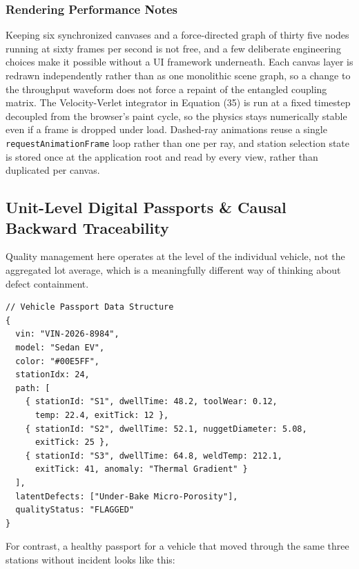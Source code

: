 \documentclass[11pt]{article}
\begin{document}
\subsubsection{Rendering Performance Notes}

Keeping six synchronized canvases and a force-directed graph of thirty five nodes running at sixty frames per second is not free, and a few deliberate engineering choices make it possible without a UI framework underneath. Each canvas layer is redrawn independently rather than as one monolithic scene graph, so a change to the throughput waveform does not force a repaint of the entangled coupling matrix. The Velocity-Verlet integrator in Equation (35) is run at a fixed timestep decoupled from the browser's paint cycle, so the physics stays numerically stable even if a frame is dropped under load. Dashed-ray animations reuse a single \texttt{requestAnimationFrame} loop rather than one per ray, and station selection state is stored once at the application root and read by every view, rather than duplicated per canvas.

\subsection{Unit-Level Digital Passports \& Causal Backward Traceability}

Quality management here operates at the level of the individual vehicle, not the aggregated lot average, which is a meaningfully different way of thinking about defect containment.

\begin{tcolorbox}[colback=lightbg,colframe=sylasgray,arc=1mm,fontupper=\ttfamily\small,breakable]
\begin{verbatim}
// Vehicle Passport Data Structure
{
  vin: "VIN-2026-8984",
  model: "Sedan EV",
  color: "#00E5FF",
  stationIdx: 24,
  path: [
    { stationId: "S1", dwellTime: 48.2, toolWear: 0.12,
      temp: 22.4, exitTick: 12 },
    { stationId: "S2", dwellTime: 52.1, nuggetDiameter: 5.08,
      exitTick: 25 },
    { stationId: "S3", dwellTime: 64.8, weldTemp: 212.1,
      exitTick: 41, anomaly: "Thermal Gradient" }
  ],
  latentDefects: ["Under-Bake Micro-Porosity"],
  qualityStatus: "FLAGGED"
}
\end{verbatim}
\end{tcolorbox}

For contrast, a healthy passport for a vehicle that moved through the same three stations without incident looks like this:
\end{document}
